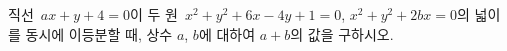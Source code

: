 직선~$ax+y+4=0$이 두 원~$x^2+y^2+6x-4y+1=0$, $x^2+y^2+2bx=0$의 넓이를 동시에 이등분할 때, 상수 $a$, $b$에 대하여 $a+b$의 값을 구하시오.
